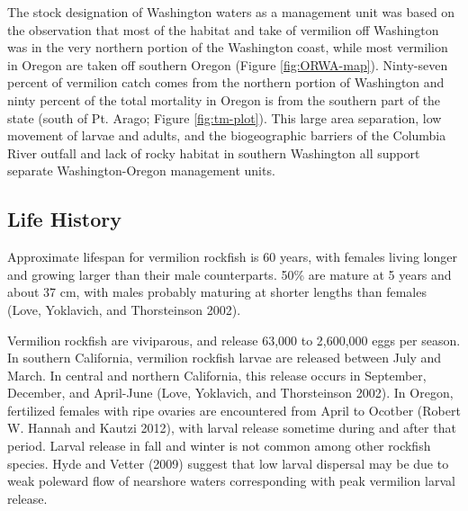 \documentclass[11pt,
  english,
  a4paper,
]{article}
\begin{document}

The stock designation of Washington waters as a management unit was based on the observation that most of the habitat and take of vermilion off Washington was in the very northern portion of the Washington coast, while most vermilion in Oregon are taken off southern Oregon (Figure \ref{fig:ORWA-map}). Ninty-seven percent of vermilion catch comes from the northern portion of Washington and ninty percent of the total mortality in Oregon is from the southern part of the state (south of Pt. Arago; Figure \ref{fig:tm-plot}). This large area separation, low movement of larvae and adults, and the biogeographic barriers of the Columbia River outfall and lack of rocky habitat in southern Washington all support separate Washington-Oregon management units.

\leavevmode\tagmcend\tagstructend\par


\hypertarget{life-history}{%
\subsection{Life History}\label{life-history}}

\leavevmode\tagmcend\tagstructend


Approximate lifespan for vermilion rockfish is 60 years, with females living longer and growing larger than their male counterparts. 50\% are mature at 5 years and about 37 cm, with males probably maturing at shorter lengths than females {(Love, Yoklavich, and Thorsteinson 2002)\leavevmode\tagmcend\tagstructend}.

\leavevmode\tagmcend\tagstructend\par


Vermilion rockfish are viviparous, and release 63,000 to 2,600,000 eggs per season. In southern California, vermilion rockfish larvae are released between July and March. In central and northern California, this release occurs in September, December, and April-June {(Love, Yoklavich, and Thorsteinson 2002)\leavevmode\tagmcend\tagstructend}. In Oregon, fertilized females with ripe ovaries are encountered from April to Ocotber {(Robert W. Hannah and Kautzi 2012)\leavevmode\tagmcend\tagstructend}, with larval release sometime during and after that period. Larval release in fall and winter is not common among other rockfish species. Hyde and Vetter {(2009)\leavevmode\tagmcend\tagstructend} suggest that low larval dispersal may be due to weak poleward flow of nearshore waters corresponding with peak vermilion larval release.
\end{document}
